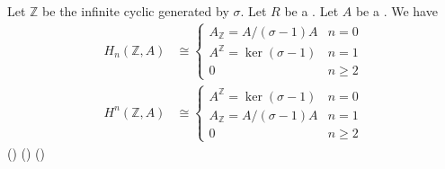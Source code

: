 \begin{proposition} \label{proposition:group_homology_cohomology_for_a_module_of_an_infinite_cyclic_group}
    Let $\mathbb{Z}$ be the infinite cyclic  generated by $\sigma$. Let $R$ be a . Let $A$ be a . We have
    \begin{align*}
        H_n(\mathbb{Z}, A) &\cong \begin{cases}
            A_{\mathbb{Z}} = A/(\sigma-1)A & n = 0 \\
            A^{\mathbb{Z}} = \ker(\sigma-1) & n = 1 \\
            0 & n \geq 2
        \end{cases} \\
        H^n(\mathbb{Z}, A) &\cong \begin{cases}
            A^{\mathbb{Z}} = \ker(\sigma-1) & n = 0 \\
            A_{\mathbb{Z}} = A/(\sigma-1)A & n = 1 \\
            0 & n \geq 2
        \end{cases}
    \end{align*}
    () () ()
\end{proposition}
